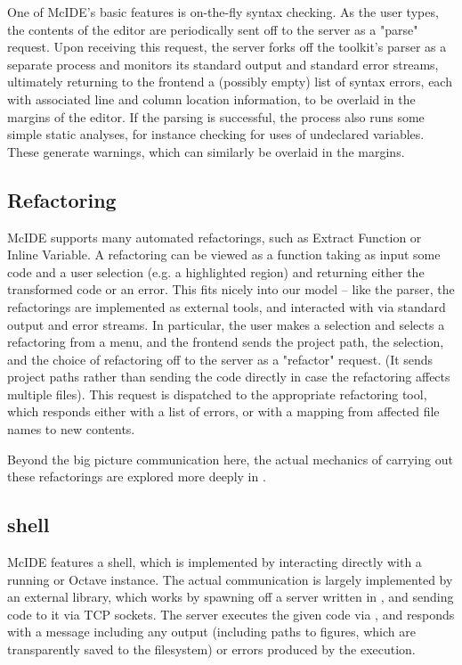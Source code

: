 One of McIDE's basic features is on-the-fly syntax checking. As the user types,
the contents of the editor are periodically sent off to the server as a "parse"
request. Upon receiving this request, the server forks off the \mclab toolkit's
\matlab parser as a separate process and monitors its standard output and
standard error streams, ultimately returning to the frontend a (possibly empty)
list of syntax errors, each with associated line and column location
information, to be overlaid in the margins of the editor. If the parsing is
successful, the process also runs some simple static analyses, for instance
checking for uses of undeclared variables. These generate warnings, which can
similarly be overlaid in the margins.

\subsection{Refactoring}

McIDE supports many automated refactorings, such as Extract Function or Inline
Variable. A refactoring can be viewed as a function taking as input some code
and a user selection (e.g. a highlighted region) and returning either the
transformed code or an error. This fits nicely into our model -- like the
parser, the refactorings are implemented as external tools, and interacted with
via standard output and error streams. In particular, the user makes a
selection and selects a refactoring from a menu, and the frontend sends the
project path, the selection, and the choice of refactoring off to the server as
a "refactor" request. (It sends project paths rather than sending the code
directly in case the refactoring affects multiple files). This request is
dispatched to the appropriate refactoring tool, which responds either with a
list of errors, or with a mapping from affected file names to new contents.

Beyond the big picture communication here, the actual mechanics of carrying out
these refactorings are explored more deeply in
.

\subsection{\matlab shell}

McIDE features a \matlab shell, which is implemented by interacting directly
with a running \matlab or Octave instance. The actual communication is largely
implemented by an external library, which works by spawning off a server
written in \matlab, and sending code to it via TCP sockets. The server executes
the given code via , and responds with a message including any
output (including paths to figures, which are transparently saved to the
filesystem) or errors produced by the execution.


